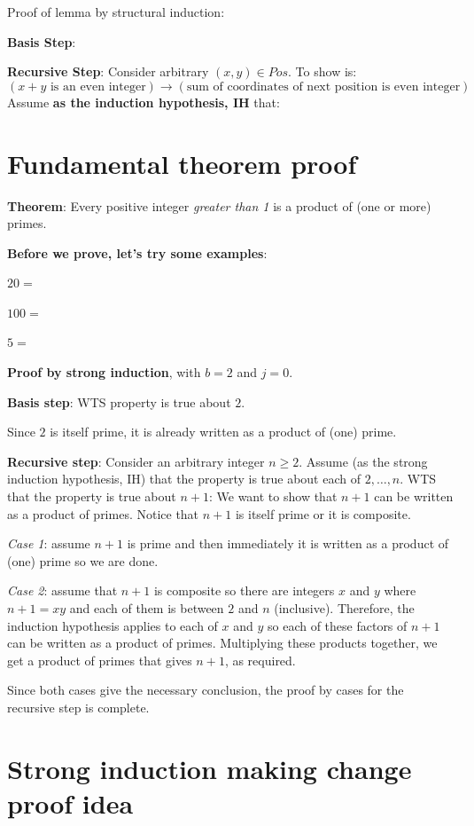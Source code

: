 \documentclass[12pt, oneside]{article}
\begin{document}
Proof of lemma by structural induction:

{\bf Basis Step}:

\vspace{100pt}


{\bf Recursive Step}:  Consider arbitrary $(x,y) \in Pos$.  To show is:
\[
(x+y \text{ is an even integer}) \to (\text{sum of coordinates of next position is even integer})
\]
Assume {\bf as the induction hypothesis, IH} that: 


\vspace{400pt} \vfill
\section*{Fundamental theorem proof}


{\bf Theorem}: Every positive integer {\it greater than 1} is a product of (one or more) primes.

{\bf Before we prove, let's try some examples}:

$20 = $

$100 = $

$5 = $


{\bf Proof by strong induction}, with $b=2$ and $j=0$.

{\bf Basis step}:  WTS property is true about  $2$.

Since $2$ is itself prime,
it is already written as a product of (one) prime.


{\bf Recursive step}: Consider an arbitrary integer $n \geq 2$.
Assume (as the strong induction hypothesis, IH) that the property is true about  each of $2, \ldots, n$.  
WTS that the property is true about  $n+1$: We want to show that $n+1$ can be written 
as a product of primes.  Notice that $n+1$ is itself prime or it is composite.

{\it Case 1}: assume $n+1$ is prime and then immediately it is written as a product
of (one) prime so we are done.  

{\it Case 2}: assume that $n+1$ is composite
so there are integers $x$ and $y$ where $n+1 = xy$ and each of them is between $2$ and $n$
(inclusive).  Therefore, the induction hypothesis applies to each of $x$ and $y$ so each 
of these factors of $n+1$ can be written as a product of primes.  Multiplying these products together, 
we get a product of primes that gives $n+1$, as required. 

Since both cases give the necessary
conclusion, the proof by cases for the recursive step is complete. \vfill
\section*{Strong induction making change proof idea}
\end{document}
